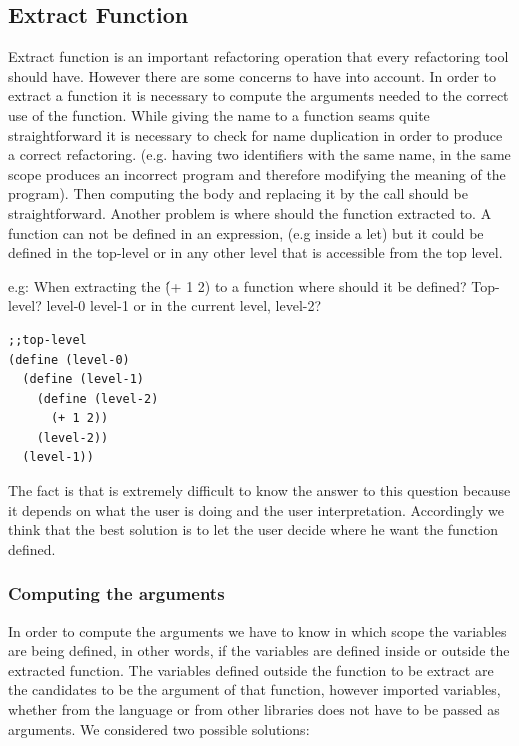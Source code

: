 \subsection{Extract Function}
Extract function is an important refactoring operation that every refactoring tool
should have.
However there are some concerns to have into account.
In order to extract a function it is necessary to compute the arguments needed
to the correct use of the function.
While giving the name to a function seams quite straightforward it is necessary to
check for name duplication in order to produce a correct refactoring. (e.g. having
two identifiers with the same name, in the same scope produces an incorrect program
and therefore modifying the meaning of the program).
Then computing the body and replacing it by the call should be straightforward.
Another problem is where should the function extracted to. A function can not
be defined in an expression, (e.g inside a let) but it could be defined in the top-level
or in any other level that is accessible from the top level.

e.g: When extracting the \'(+ 1 2) to a function where should it be defined?
Top-level? level-0 level-1 or in the current level, level-2?
\begin{lstlisting}[basicstyle=\ttfamily, caption="Extract function levels"]
;;top-level
(define (level-0)
  (define (level-1)
    (define (level-2)
      (+ 1 2))
    (level-2))
  (level-1))
\end{lstlisting}

The fact is that is extremely difficult to know the answer to this question because
it depends on what the user is doing and the user interpretation.
Accordingly we think that the best solution is to let the user decide where
he want the function defined.


\subsubsection{Computing the arguments}

In order to compute the arguments we have to know in which scope the variables are being defined, in other words,
if the variables are defined inside or outside the extracted function. %
The variables defined outside the function to be extract are the candidates to be the argument %
of that function, however imported variables, whether from the language or from other libraries
does not have to be passed as arguments.
We considered two possible solutions:

